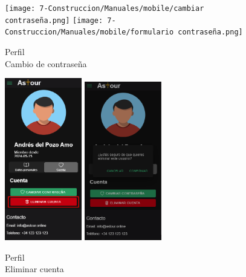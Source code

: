 \begin{figure}[H]
	\centering
	\begin{minipage}{0.45\textwidth}
		\centering
		\texttt{[image: 7-Construccion/Manuales/mobile/cambiar contraseña.png]}
		\texttt{[image: 7-Construccion/Manuales/mobile/formulario contraseña.png]}
		\caption{Perfil \\ Cambio de contraseña}
		\label{fig:areaPersonal-cambiar-contraseña}
	\end{minipage}
	\hfill
	\begin{minipage}{0.45\textwidth}
		\centering
		\includegraphics[width=0.3\textwidth]{7-Construccion/Manuales/mobile/eliminar cuenta.png}
		\includegraphics[width=0.3\textwidth]{7-Construccion/Manuales/mobile/confirmar eliminacion cuenta.png}
		\caption{Perfil \\ Eliminar cuenta}
		\label{fig:areaPersonal-eliminar}
	\end{minipage}
\end{figure}


